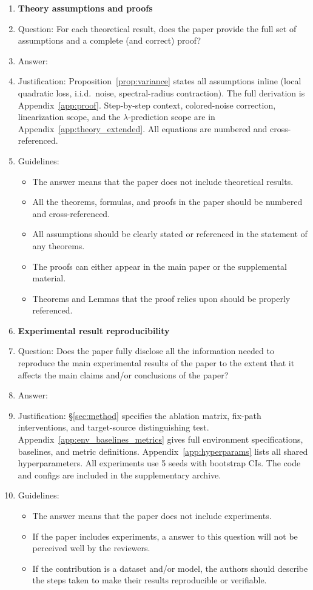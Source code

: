 \begin{enumerate}
\item {\bf Theory assumptions and proofs}
    \item[] Question: For each theoretical result, does the paper provide the full set of assumptions and a complete (and correct) proof?
    \item[] Answer: \answerYes{}
    \item[] Justification: Proposition~\ref{prop:variance} states all assumptions inline (local quadratic loss, i.i.d.\ noise, spectral-radius contraction). The full derivation is Appendix~\ref{app:proof}. Step-by-step context, colored-noise correction, linearization scope, and the $\lambda$-prediction scope are in Appendix~\ref{app:theory_extended}. All equations are numbered and cross-referenced.
    \item[] Guidelines:
    \begin{itemize}
        \item The answer \answerNA{} means that the paper does not include theoretical results.
        \item All the theorems, formulas, and proofs in the paper should be numbered and cross-referenced.
        \item All assumptions should be clearly stated or referenced in the statement of any theorems.
        \item The proofs can either appear in the main paper or the supplemental material.
        \item Theorems and Lemmas that the proof relies upon should be properly referenced.
    \end{itemize}

    \item {\bf Experimental result reproducibility}
    \item[] Question: Does the paper fully disclose all the information needed to reproduce the main experimental results of the paper to the extent that it affects the main claims and/or conclusions of the paper?
    \item[] Answer: \answerYes{}
    \item[] Justification: \S\ref{sec:method} specifies the ablation matrix, fix-path interventions, and target-source distinguishing test. Appendix~\ref{app:env_baselines_metrics} gives full environment specifications, baselines, and metric definitions. Appendix~\ref{app:hyperparams} lists all shared hyperparameters. All experiments use 5 seeds with bootstrap CIs. The code and configs are included in the supplementary archive.
    \item[] Guidelines:
    \begin{itemize}
        \item The answer \answerNA{} means that the paper does not include experiments.
        \item If the paper includes experiments, a \answerNo{} answer to this question will not be perceived well by the reviewers.
        \item If the contribution is a dataset and\slash or model, the authors should describe the steps taken to make their results reproducible or verifiable.
    \end{itemize}



\end{enumerate}
